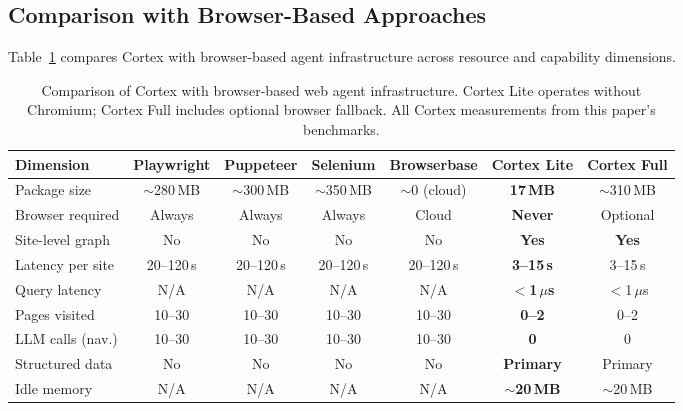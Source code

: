 \documentclass[10pt, twocolumn]{article}
\begin{document}
\subsection{Comparison with Browser-Based Approaches}
\label{sec:comparison}

Table~\ref{tab:comparison} compares Cortex with browser-based agent infrastructure across resource and capability dimensions.

\begin{table}[t]
\caption{Comparison of Cortex with browser-based web agent infrastructure. Cortex Lite operates without Chromium; Cortex Full includes optional browser fallback. All Cortex measurements from this paper's benchmarks.}
\label{tab:comparison}
\centering
\small
\begin{tabular}{@{}lcccccc@{}}
\toprule
\textbf{Dimension} & \textbf{Playwright} & \textbf{Puppeteer} & \textbf{Selenium} & \textbf{Browserbase} & \textbf{Cortex Lite} & \textbf{Cortex Full} \\
\midrule
Package size & $\sim$280\,MB & $\sim$300\,MB & $\sim$350\,MB & $\sim$0 (cloud) & \textbf{17\,MB} & $\sim$310\,MB \\
Browser required & Always & Always & Always & Cloud & \textbf{Never} & Optional \\
Site-level graph & No & No & No & No & \textbf{Yes} & \textbf{Yes} \\
Latency per site & 20--120\,s & 20--120\,s & 20--120\,s & 20--120\,s & \textbf{3--15\,s} & 3--15\,s \\
Query latency & N/A & N/A & N/A & N/A & \textbf{$<$1\,$\mu$s} & $<$1\,$\mu$s \\
Pages visited & 10--30 & 10--30 & 10--30 & 10--30 & \textbf{0--2} & 0--2 \\
LLM calls (nav.) & 10--30 & 10--30 & 10--30 & 10--30 & \textbf{0} & 0 \\
Structured data & No & No & No & No & \textbf{Primary} & Primary \\
Idle memory & N/A & N/A & N/A & N/A & \textbf{$\sim$20\,MB} & $\sim$20\,MB \\
\bottomrule
\end{tabular}
\end{table}
\end{document}
